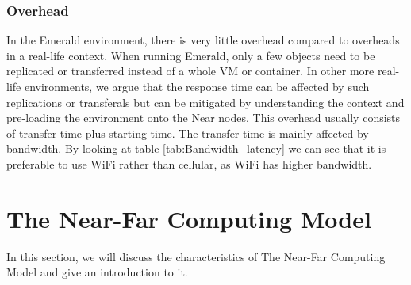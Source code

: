 \subsubsection{Overhead}
In the Emerald environment, there is very little overhead compared to overheads in a real-life context. When running Emerald, only a few objects need to be replicated or transferred instead of a whole VM or container. In other more real-life environments, we argue that the response time can be affected by such replications or transferals but can be mitigated by understanding the context and pre-loading the environment onto the Near nodes. This overhead usually consists of transfer time plus starting time. The transfer time is mainly affected by bandwidth. By looking at table \ref{tab:Bandwidth_latency} we can see that it is preferable to use WiFi rather than cellular, as WiFi has higher bandwidth.








\section{The Near-Far Computing Model}
In this section, we will discuss the characteristics of The Near-Far Computing Model and give an introduction to it. 





